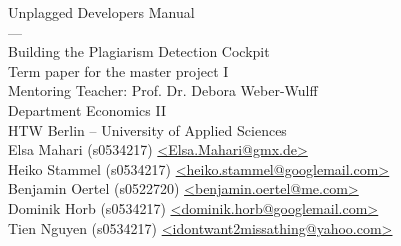 \begin{titlepage}
\vspace*{2cm}

\begin{center}
\Huge
Unplagged Developers Manual\\
---\\
\large
Building the Plagiarism Detection Cockpit\\
\vfill
Term paper for the master project I \\ Mentoring Teacher: Prof. Dr. Debora Weber-Wulff\\
\vspace{1cm}
\normalsize
Department Economics II\\
HTW Berlin -- University of Applied Sciences\\

\vspace{4mm}
Elsa Mahari (s0534217) \href{mailto:elsa.mahari@gmx.de}{\textless Elsa.Mahari@gmx.de\textgreater}\\
Heiko Stammel (s0534217) \href{mailto:heiko.stammel@googlemail.com}{\textless heiko.stammel@googlemail.com\textgreater}\\
Benjamin Oertel (s0522720) \href{mailto:benjamin.oertel@me.com}{\textless benjamin.oertel@me.com\textgreater}\\
Dominik Horb (s0534217) \href{mailto:dominik.horb@googlemail.com}{\textless dominik.horb@googlemail.com\textgreater}\\
Tien Nguyen (s0534217) \href{mailto:idontwant2missathing@yahoo.com}{\textless idontwant2missathing@yahoo.com\textgreater}\\


\end{center}
\end{titlepage}